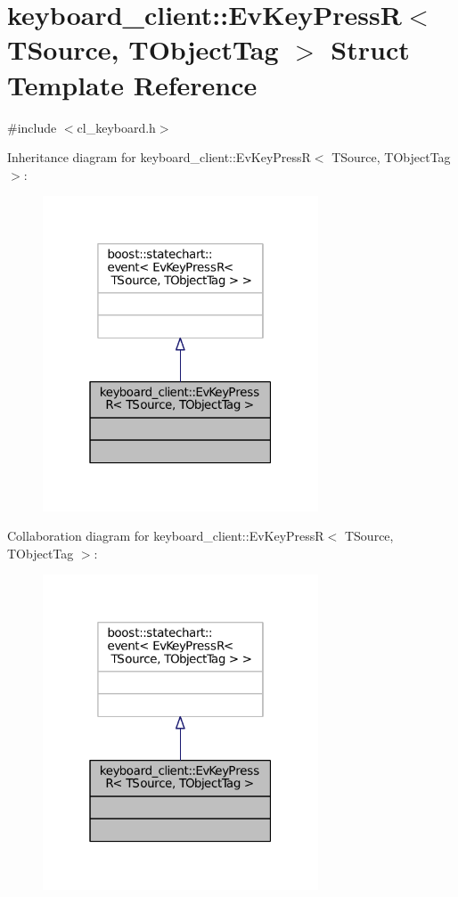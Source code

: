 \hypertarget{structkeyboard__client_1_1EvKeyPressR}{}\section{keyboard\+\_\+client\+:\+:Ev\+Key\+PressR$<$ T\+Source, T\+Object\+Tag $>$ Struct Template Reference}
\label{structkeyboard__client_1_1EvKeyPressR}


{\ttfamily \#include $<$cl\+\_\+keyboard.\+h$>$}



Inheritance diagram for keyboard\+\_\+client\+:\+:Ev\+Key\+PressR$<$ T\+Source, T\+Object\+Tag $>$\+:
\nopagebreak
\begin{figure}[H]
\begin{center}
\leavevmode
\includegraphics[width=232pt]{structkeyboard__client_1_1EvKeyPressR__inherit__graph}
\end{center}
\end{figure}


Collaboration diagram for keyboard\+\_\+client\+:\+:Ev\+Key\+PressR$<$ T\+Source, T\+Object\+Tag $>$\+:
\nopagebreak
\begin{figure}[H]
\begin{center}
\leavevmode
\includegraphics[width=232pt]{structkeyboard__client_1_1EvKeyPressR__coll__graph}
\end{center}
\end{figure}



